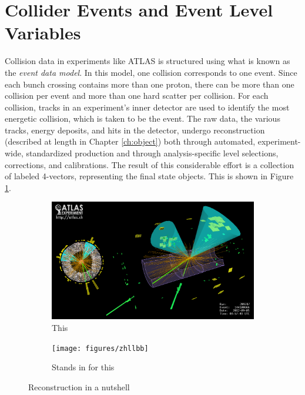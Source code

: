 \section{Collider Events and Event Level Variables}
Collision data in experiments like ATLAS is structured using what is known as the \emph{event data model}.  In this model, one collision corresponds to one event.  Since each bunch crossing contains more than one proton, there can be more than one collision per event and more than one hard scatter per collision.  For each collision, tracks in an experiment's inner detector are used to identify the most energetic collision, which is taken to be the event.  The raw data, the various tracks, energy deposits, and hits in the detector, undergo reconstruction (described at length in Chapter \ref{ch:object}) both through automated, experiment-wide, standardized production and through analysis-specific level selections, corrections, and calibrations.  The result of this considerable effort is a collection of labeled 4-vectors, representing the final state objects.  This is shown in Figure \ref{fig:recon}.

\begin{figure}[!htbp]\captionsetup{justification=centering}
  \centering
  \begin{subfigure}[t]{0.420000\textwidth}\centering\includegraphics[width=\textwidth]{figures/atlas/atlas_3dzhllbb}\caption{This}\end{subfigure}
  \begin{subfigure}[t]{0.420000\textwidth}\centering\texttt{[image: figures/zhllbb]}\caption{Stands in for this}\end{subfigure}
  \caption{Reconstruction in a nutshell}
  \label{fig:recon}
\end{figure}


